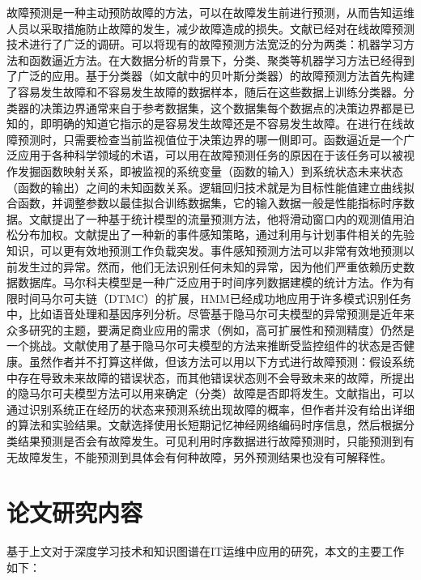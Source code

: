 故障预测是一种主动预防故障的方法，可以在故障发生前进行预测，从而告知运维人员以采取措施防止故障的发生，减少故障造成的损失。文献\parencite{salfner2010survey}已经对在线故障预测技术进行了广泛的调研。可以将现有的故障预测方法宽泛的分为两类：机器学习方法和函数逼近方法。在大数据分析的背景下，分类、聚类等机器学习方法已经得到了广泛的应用。基于分类器（如文献\parencite{tan2012prepare}中的贝叶斯分类器）的故障预测方法首先构建了容易发生故障和不容易发生故障的数据样本，随后在这些数据上训练分类器。分类器的决策边界通常来自于参考数据集，这个数据集每个数据点的决策边界都是已知的，即明确的知道它指示的是容易发生故障还是不容易发生故障。在进行在线故障预测时，只需要检查当前监视值位于决策边界的哪一侧即可。函数逼近是一个广泛应用于各种科学领域的术语，可以用在故障预测任务的原因在于该任务可以被视作发掘函数映射关系，即被监视的系统变量（函数的输入）到系统状态未来状态（函数的输出）之间的未知函数关系。逻辑回归技术就是为目标性能值建立曲线拟合函数，并调整参数以最佳拟合训练数据集\parencite{salfner2010survey}，它的输入数据一般是性能指标时序数据。文献\parencite{dalmazo2013predicting}提出了一种基于统计模型的流量预测方法，他将滑动窗口内的观测值用泊松分布加权。文献\parencite{sladescu2012event}提出了一种新的事件感知策略，通过利用与计划事件相关的先验知识，可以更有效地预测工作负载突发。事件感知预测方法可以非常有效地预测以前发生过的异常。然而，他们无法识别任何未知的异常，因为他们严重依赖历史数据数据库。马尔科夫模型是一种广泛应用于时间序列数据建模的统计方法。作为有限时间马尔可夫链（DTMC）的扩展，HMM已经成功地应用于许多模式识别任务中，比如语音处理和基因序列分析。尽管基于隐马尔可夫模型的异常预测是近年来众多研究的主题，要满足商业应用的需求（例如，高可扩展性和预测精度）仍然是一个挑战。文献\parencite{purushotham2005multi}使用了基于隐马尔可夫模型的方法来推断受监控组件的状态是否健康。虽然作者并不打算这样做，但该方法可以用以下方式进行故障预测：假设系统中存在导致未来故障的错误状态，而其他错误状态则不会导致未来的故障，所提出的隐马尔可夫模型方法可以用来确定（分类）故障是否即将发生。文献\parencite{boutros2011detection}指出，可以通过识别系统正在经历的状态来预测系统出现故障的概率，但作者并没有给出详细的算法和实验结果。文献\parencite{li2020predicting,gao2020task}选择使用长短期记忆神经网络编码时序信息，然后根据分类结果预测是否会有故障发生。可见利用时序数据进行故障预测时，只能预测到有无故障发生，不能预测到具体会有何种故障，另外预测结果也没有可解释性。

\section{论文研究内容}
基于上文对于深度学习技术和知识图谱在IT运维中应用的研究，本文的主要工作如下：


